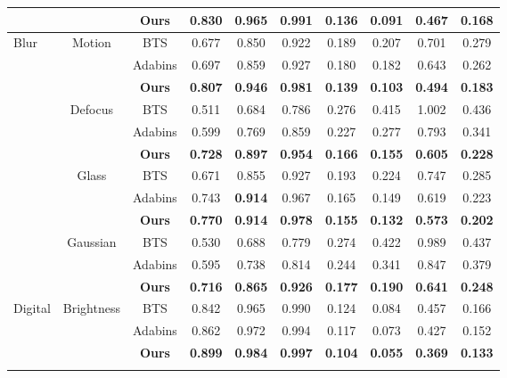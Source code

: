 \documentclass{article}
\begin{document}
\begin{table*}[!htbp]
{\begin{tabular}{l | c | c | ccccccc}
& & \textbf{Ours} & \textbf{0.830} & \textbf{0.965} & \textbf{0.991} & \textbf{0.136}  & \textbf{0.091} & \textbf{0.467} & \textbf{0.168} \\ \midrule
\multirow{12}{*}{Blur} & \multirow{3}{*}{Motion} & BTS & 0.677 & 0.850 & 0.922 & 0.189 & 0.207 & 0.701 & 0.279 \\
                                & & Adabins & 0.697 & 0.859 & 0.927 & 0.180 & 0.182 & 0.643 & 0.262 \\
& & \textbf{Ours} & \textbf{0.807} & \textbf{0.946} & \textbf{0.981} & \textbf{0.139}  & \textbf{0.103} & \textbf{0.494} & \textbf{0.183} \\ \cmidrule{2-10}
      &  \multirow{3}{*}{Defocus} & BTS & 0.511 & 0.684 & 0.786 & 0.276 & 0.415 & 1.002 & 0.436 \\
                                & & Adabins & 0.599 & 0.769 & 0.859 & 0.227 & 0.277 & 0.793 & 0.341 \\
& & \textbf{Ours} & \textbf{0.728} & \textbf{0.897} & \textbf{0.954} & \textbf{0.166}  & \textbf{0.155} & \textbf{0.605} & \textbf{0.228} \\ \cmidrule{2-10}
    &  \multirow{3}{*}{Glass} & BTS & 0.671 & 0.855 & 0.927 & 0.193 & 0.224 & 0.747 & 0.285 \\
                                & & Adabins & 0.743 & \textbf{0.914} & 0.967 & 0.165 & 0.149 & 0.619 & 0.223 \\
& & \textbf{Ours} & \textbf{0.770} & \textbf{0.914} & \textbf{0.978} & \textbf{0.155}  & \textbf{0.132} & \textbf{0.573} & \textbf{0.202} \\ \cmidrule{2-10}
    &  \multirow{3}{*}{Gaussian} & BTS & 0.530 & 0.688 & 0.779 & 0.274 & 0.422 & 0.989 & 0.437\\
                                & & Adabins & 0.595 & 0.738 & 0.814 & 0.244 & 0.341 & 0.847 & 0.379 \\
& & \textbf{Ours} & \textbf{0.716} & \textbf{0.865} & \textbf{0.926} & \textbf{0.177} & \textbf{0.190} & \textbf{0.641} & \textbf{0.248} \\ \midrule
\multirow{12}{*}{Digital} & \multirow{3}{*}{Brightness} & BTS & 0.842 & 0.965 & 0.990 & 0.124 & 0.084 & 0.457 & 0.166  \\
                                & & Adabins & 0.862 & 0.972 & 0.994 & 0.117 & 0.073 & 0.427 & 0.152 \\
& & \textbf{Ours} & \textbf{0.899} & \textbf{0.984} & \textbf{0.997} & \textbf{0.104} & \textbf{0.055} & \textbf{0.369} & \textbf{0.133} \\ \cmidrule{2-10}

\end{tabular}}
\end{table*}
\end{document}
